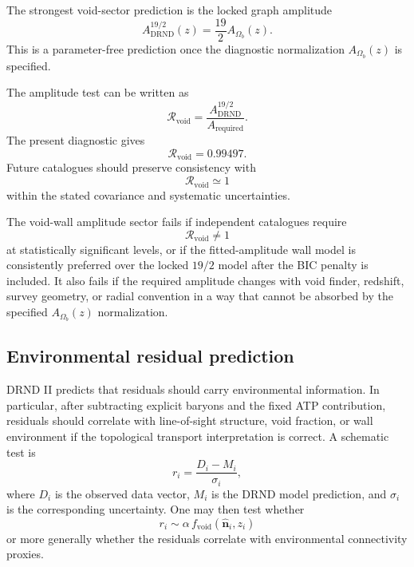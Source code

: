 \documentclass[12pt]{iopart}
\begin{document}
The strongest void-sector prediction is the locked graph amplitude
\begin{equation}
A_{\mathrm{DRND}}^{19/2}(z)
=
\frac{19}{2}A_{\Omega_b}(z).
\end{equation}
This is a parameter-free prediction once the diagnostic normalization \(A_{\Omega_b}(z)\) is specified.

The amplitude test can be written as
\begin{equation}
\mathcal{R}_{\mathrm{void}}
=
\frac{
A_{\mathrm{DRND}}^{19/2}
}{
A_{\mathrm{required}}
}.
\end{equation}
The present diagnostic gives
\begin{equation}
\mathcal{R}_{\mathrm{void}}=0.99497.
\end{equation}
Future catalogues should preserve consistency with
\begin{equation}
\mathcal{R}_{\mathrm{void}}\simeq 1
\end{equation}
within the stated covariance and systematic uncertainties.

The void-wall amplitude sector fails if independent catalogues require
\begin{equation}
\mathcal{R}_{\mathrm{void}}
\neq
1
\end{equation}
at statistically significant levels, or if the fitted-amplitude wall model is consistently preferred over the locked \(19/2\) model after the BIC penalty is included. It also fails if the required amplitude changes with void finder, redshift, survey geometry, or radial convention in a way that cannot be absorbed by the specified \(A_{\Omega_b}(z)\) normalization.

\subsection{Environmental residual prediction}

DRND II predicts that residuals should carry environmental information. In particular, after subtracting explicit baryons and the fixed ATP contribution, residuals should correlate with line-of-sight structure, void fraction, or wall environment if the topological transport interpretation is correct. A schematic test is
\begin{equation}
r_i
=
\frac{
D_i-M_i
}{
\sigma_i
},
\end{equation}
where \(D_i\) is the observed data vector, \(M_i\) is the DRND model prediction, and \(\sigma_i\) is the corresponding uncertainty. One may then test whether
\begin{equation}
r_i
\sim
\alpha\,f_{\mathrm{void}}(\hat{\mathbf{n}}_i,z_i)
\end{equation}
or more generally whether the residuals correlate with environmental connectivity proxies.
\end{document}
